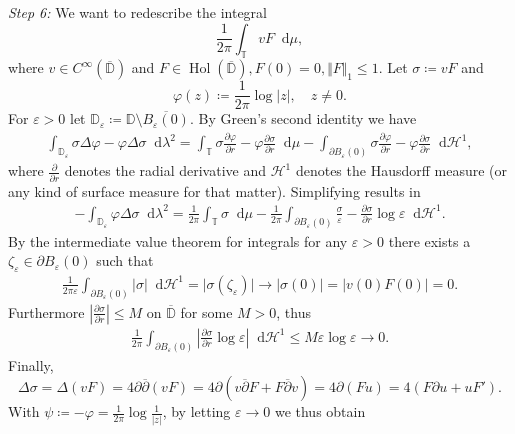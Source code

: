 \documentclass[letterpaper, 11pt]{article}
\newcommand{\D}{\mathbb{D}}
\newcommand{\T}{\mathbb{T}}
\newcommand{\1}{\mathds{1}}
\newcommand{\dd}{\mathop{}\!\mathrm{d}}
\newcommand{\cl}[1]{\overline{#1}}
\newcommand{\wirtz}{\partial}
\newcommand{\wirtzbar}{\overline{\partial}}
\DeclareMathOperator*{\Hol}{Hol}
\theoremstyle{definition}
\newenvironment{innerproof}
 {\renewcommand{\qedsymbol}{}\proof}
 {\endproof}
\begin{document}
\begin{innerproof}[Proof (continued)]
  \textit{Step 6:} We want to redescribe the integral
  $$ \frac{1}{2\pi} \int_\T v F \dd \mu, $$
  where $v \in C^\infty(\cl{\D})$ and $F \in \Hol(\cl{\D}), F(0) = 0, \Vert F \Vert_1 \leq 1$. Let $\sigma \coloneqq v F$ and
  $$ \varphi(z) \coloneqq \frac{1}{2\pi} \log \vert z \vert, \quad z \neq 0. $$
  For $\varepsilon > 0$ let $\D_\varepsilon \coloneqq \D \setminus \cl{B_\varepsilon(0)}$. By Green's second identity we have
  \begin{align*}
    \int_{\D_\varepsilon} \sigma \Delta \varphi - \varphi \Delta \sigma \dd \lambda^2 = \int_\T \sigma \frac{\partial \varphi}{\partial r} - \varphi \frac{\partial \sigma}{\partial r} \dd \mu - \int_{\partial B_\varepsilon(0)} \sigma \frac{\partial \varphi}{\partial r} - \varphi \frac{\partial \sigma}{\partial r} \dd \mathcal{H}^1,
  \end{align*}
  where $\frac{\partial}{\partial r}$ denotes the radial derivative and $\mathcal{H}^1$ denotes the Hausdorff measure (or any kind of surface measure for that matter). Simplifying results in
  \begin{align*}
    -\int_{\D_\varepsilon} \varphi \Delta \sigma \dd \lambda^2 = \frac{1}{2 \pi} \int_\T \sigma \dd \mu - \frac{1}{2 \pi} \int_{\partial B_\varepsilon(0)} \frac{\sigma}{\varepsilon} - \frac{\partial \sigma}{\partial r} \log \varepsilon \dd \mathcal{H}^1.
  \end{align*}
  By the intermediate value theorem for integrals for any $\varepsilon > 0$ there exists a $\zeta_\varepsilon \in \partial B_\varepsilon(0)$ such that
  \begin{align*}
    \frac{1}{2\pi\varepsilon} \int_{\partial B_\varepsilon(0)} \vert \sigma \vert \dd \mathcal{H}^1 = \vert \sigma(\zeta_\varepsilon) \vert \to \vert \sigma(0) \vert = \vert v(0) F(0) \vert = 0.
  \end{align*}
  Furthermore $\left\vert \frac{\partial \sigma}{\partial r} \right\vert \leq M$ on $\cl{\D}$ for some $M > 0$, thus
  \begin{align*}
    \frac{1}{2\pi} \int_{\partial B_\varepsilon(0)} \left\vert \frac{\partial \sigma}{\partial r} \log \varepsilon \right\vert \dd \mathcal{H}^1 \leq M \varepsilon \log \varepsilon \to 0.
  \end{align*}
  Finally,
  $$ \Delta \sigma = \Delta (v F) = 4 \wirtz \wirtzbar (v F) = 4 \wirtz (v \wirtzbar F + F \wirtzbar v) = 4\wirtz(F u) = 4(F \wirtz u + u F'). $$
  With $\psi \coloneqq -\varphi = \frac{1}{2\pi} \log \frac{1}{\vert z \vert}$, by letting $\varepsilon \to 0$ we thus obtain
  \begin{align*}

\end{align*}
\end{innerproof}
\end{document}
